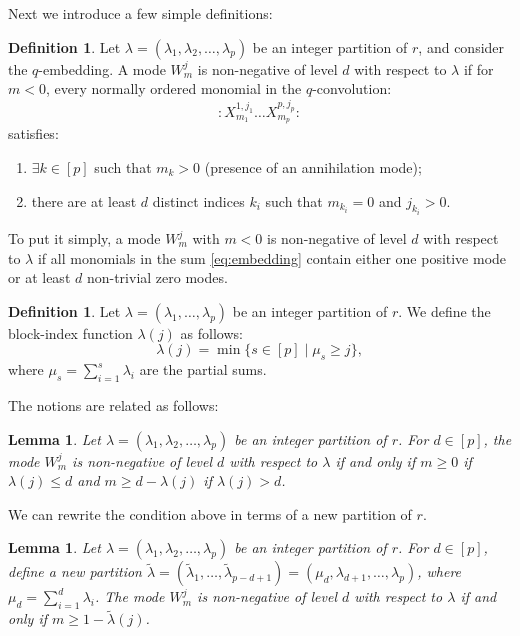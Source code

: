 \documentclass[reqno,11pt]{amsart}
\theoremstyle{plain}
\newtheorem{lemma}[theorem]{Lemma}
\theoremstyle{definition}
\newtheorem{definition}[theorem]{Definition}
\theoremstyle{remark}
\numberwithin{equation}{section}
\newcommand{\1}{\mathds{1}}
\newcommand{\2}{\frac{1}{2}}
\begin{document}
{				Next we introduce a few simple definitions: 
				
				\begin{definition}\label{d:lambdann}
					Let $\lambda = (\lambda_1, \lambda_2, \ldots, \lambda_p)$ be an integer partition of $r$, and consider the $q$-embedding. A mode $W^j_m$ is non-negative of level $d$ with respect to $\lambda$ if for $m < 0$, every normally ordered monomial in the $q$-convolution:
					\begin{equation}
						: X^{1,j_1}_{m_1} \dots X^{p,j_p}_{m_p} :
					\end{equation}
					satisfies:
					\begin{enumerate}
						\item[(a)] $\exists k \in [p]$ such that $m_k > 0$ (presence of an annihilation mode);
						\item[(b)] there are at least $d$ distinct indices $k_i$ such that $m_{k_i} = 0$ and $j_{k_i} > 0$.
					\end{enumerate}
				\end{definition}
				To put it simply, a mode $W^j_m$ with $m<0$ is non-negative of level $d$ with respect to $\lambda$ if all monomials in the sum \eqref{eq:embedding} contain either one positive mode or at least $d$ non-trivial zero modes.
				
				\begin{definition}\label{d:lambdaj}
					Let $\lambda = (\lambda_1, \dots, \lambda_p)$ be an integer partition of $r$. We define the block-index function $\lambda(j)$ as follows:
					\begin{equation}
						\lambda(j) = \min \{ s \in [p] \mid \mu_s \geq j \},
					\end{equation}
					where $\mu_s = \sum_{i=1}^s \lambda_i$ are the partial sums.
				\end{definition}
				The notions are related as follows:
				
				\begin{lemma}\label{l:lambdann}
					Let $\lambda = (\lambda_1, \lambda_2, \ldots, \lambda_p)$ be an integer partition of $r$. For $d \in [p]$, the mode $W^j_m$ is non-negative of level $d$ with respect to $\lambda$ if and only if $m \geq 0$ if $\lambda(j) \leq  d$ and $m \geq d - \lambda(j)$ if $\lambda(j) > d$.
				\end{lemma}
				
				We can rewrite the condition above in terms of a new partition of $r$.
				\begin{lemma}\label{l:newpart}
					Let $\lambda = (\lambda_1, \lambda_2, \ldots, \lambda_p)$ be an integer partition of $r$. For $d \in [p]$, define a new partition $\tilde{\lambda} =(\tilde{\lambda}_1, \ldots, \tilde{\lambda}_{p-d+1}) = (\mu_d, \lambda_{d+1} ,\ldots, \lambda_p)$, where $\mu_d = \sum_{i=1}^d \lambda_i$. The mode $W^j_m$ is non-negative of level $d$ with respect to $\lambda$ if and only if $m \geq 1 - \tilde{\lambda}(j)$.
				\end{lemma}
				
}
\end{document}
